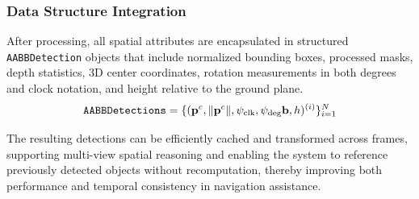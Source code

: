 \subsubsection{Data Structure Integration}

After processing, all spatial attributes are encapsulated in structured \texttt{AABBDetection} objects that include normalized bounding boxes, processed masks, depth statistics, 3D center coordinates, rotation measurements in both degrees and clock notation, and height relative to the ground plane.
\begin{equation}
\texttt{AABBDetections} = \{ (\mathbf{p}^c, \|\mathbf{p}^c\|, \psi_{\text{clk}}, \psi_{\text{deg}} \mathbf{b}, h)^{(i)}\}_{i=1}^{N}
\end{equation}

The resulting detections can be efficiently cached and transformed across frames, supporting multi-view spatial reasoning and enabling the system to reference previously detected objects without recomputation, thereby improving both performance and temporal consistency in navigation assistance.
